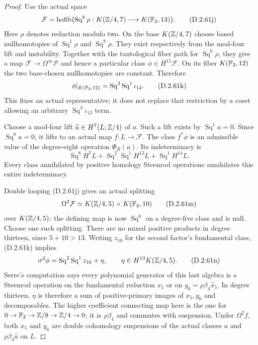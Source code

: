 \begin{proof}
Use the actual space
\[
 \mathcal F=\operatorname{hofib}
  \bigl(\operatorname{Sq}^6\rho:
       K(\mathbb Z/4,7)\longrightarrow K(\mathbb F_2,13)\bigr).
 \tag{D.2.61j}
\]
Here $\rho$ denotes reduction modulo two.
On the base $K(\mathbb Z/4,7)$ choose based nullhomotopies
of $\operatorname{Sq}^1\rho$ and
$\operatorname{Sq}^8\rho$.
They exist respectively from the mod-four lift and
instability.  Together with the tautological fiber path
for $\operatorname{Sq}^6\rho$, they give a map
$\mathcal F\to\Omega^\infty\mathcal P$ and hence a
particular class $\phi\in H^{15}\mathcal F$.
On its fiber $K(\mathbb F_2,12)$ the two base-chosen
nullhomotopies are constant.  Therefore
\[
             \phi|_{K(\mathbb F_2,12)}
                    =\operatorname{Sq}^2\operatorname{Sq}^1
                                                \iota_{12}.
             \tag{D.2.61k}
\]
This fixes an actual representative; it does not replace
that restriction by a coset allowing an arbitrary
$\operatorname{Sq}^3\iota_{12}$ term.

Choose a mod-four lift $\widehat a\in H^7(L;\mathbb Z/4)$
of $a$.  Such a lift exists by
$\operatorname{Sq}^1a=0$.  Since
$\operatorname{Sq}^6a=0$, it lifts to an actual map
$f:L\to\mathcal F$.
The class $f^*\phi$ is an admissible value of the
degree-eight operation $\Phi_R(a)$.
Its indeterminacy is
\[
 \operatorname{Sq}^8H^7L+
 \operatorname{Sq}^2\operatorname{Sq}^1H^{12}L+
 \operatorname{Sq}^1H^{14}L.
 \tag{D.2.61l}
\]
Every class annihilated by positive homology Steenrod
operations annihilates this entire indeterminacy.

Double looping \textup{(D.2.61j)} gives an actual splitting
\[
 \Omega^2\mathcal F\simeq
            K(\mathbb Z/4,5)\times K(\mathbb F_2,10)
 \tag{D.2.61m}
\]
over $K(\mathbb Z/4,5)$: the defining map is now
$\operatorname{Sq}^6$ on a degree-five class and is null.
Choose one such splitting.  There are no mixed positive
products in degree thirteen, since $5+10>13$.
Writing $z_{10}$ for the second factor's fundamental
class, \textup{(D.2.61k)} implies
\[
 \sigma^2\phi=\operatorname{Sq}^2\operatorname{Sq}^1z_{10}
                       +\eta,
       \qquad \eta\in H^{13}K(\mathbb Z/4,5).
 \tag{D.2.61n}
\]
Serre's computation
\cite[Section~2, no.~11, Theorem~4 and its proof,
pp.~204--205]{I_Serre1953}
says every polynomial generator of this last algebra
is a Steenrod operation on the fundamental reduction
$x_5$ or on $y_6=\rho\beta_4\widehat x_5$.
In degree thirteen, $\eta$ is therefore a sum of
positive-primary images of $x_5,y_6$ and decomposables.
The higher coefficient connecting map here is the one
for $0\to\mathbb F_2\to\mathbb Z/8\to\mathbb Z/4\to0$;
it is $\rho\beta_4$ and commutes with suspension.
Under $\Omega^2f$, both $x_5$ and $y_6$ are double
cohomology suspensions of the actual classes
$a$ and $\rho\beta_4\widehat a$ on $L$.


\end{proof}
